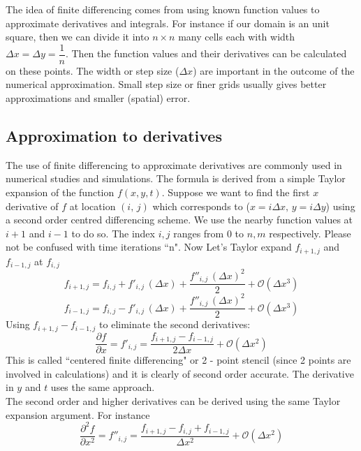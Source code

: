 The idea of finite differencing comes from using known function values to approximate derivatives and integrals. For instance if our domain is an unit square, then we can divide it into $n \times n$ many cells each with width $\Delta x = \Delta y = \dfrac{1}{n}$. Then the function values and their derivatives can be calculated on these points. The width or step size ($\Delta x$) are important in the outcome of the numerical approximation. Small step size or finer grids usually gives better approximations and smaller (spatial) error.

\subsection{Approximation to derivatives}
The use of finite differencing to approximate derivatives are commonly used in numerical studies and simulations. The formula is derived from a simple Taylor expansion of the function $f(x,y,t)$. Suppose we want to find the first $x$ derivative of $f$ at location $(i,\,j)$ which corresponds to ($x= i \Delta x,\, y= i\Delta y$) using a second order centred differencing scheme. We use the nearby function values at $i+1$ and $i-1$ to do so. The index $i,j$ ranges from $0$ to $n,m$ respectively. Please not be confused with time iterations ``n". Now Let's Taylor expand $f_{i+1,j}$ and $f_{i-1,j}$ at $f_{i,j}$
\begin{equation*}
f_{i+1,j} = f_{i,j} + f'_{i,j}\,(\Delta x)+\dfrac{f''_{i,j}\,(\Delta x)^2}{2} + \mathcal{O}(\Delta x^3)
\end{equation*}
\begin{equation*}
f_{i-1,j} = f_{i,j} - f'_{i,j}\,(\Delta x)+\dfrac{f''_{i,j}\,(\Delta x)^2}{2} + \mathcal{O}(\Delta x^3)
\end{equation*}
Using $f_{i+1,j} - f_{i-1,j}$ to eliminate the second derivatives:
\begin{equation*}
\dfrac{\partial f}{\partial x} = f'_{i,j} = \dfrac{f_{i+1,j} - f_{i-1,j}}{2\Delta x} + \mathcal{O}(\Delta x^2)
\end{equation*}
This is called ``centered finite differencing" or 2 - point stencil (since 2 points are involved in calculations) and it is clearly of second order accurate. The derivative in $y$  and $t$ uses the same approach.\\

The second order and higher derivatives can be derived using the same Taylor expansion argument. For instance
\begin{equation*}
\dfrac{\partial^2 f}{\partial x^2} = f''_{i,j} = \dfrac{f_{i+1,j} - f_{i,j} + f_{i-1,j}}{\Delta x^2} + \mathcal{O}(\Delta x^2)
\end{equation*}

